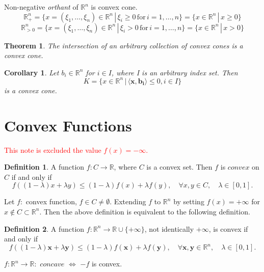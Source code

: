 \documentclass{jsarticle}
\newtheorem{thm}{Theorem}[section]
\newtheorem{cor}{Corollary}[thm]
\theoremstyle{definition}
\newtheorem{dfn}{Definition}[section]
\begin{document}
Non-negative \textit{orthant}  of $\mathbb{R}^n$ is convex cone.
\[
\mathbb{R}^n_{+} = \{x = (\xi_1,  \dots, \xi_n) \in \mathbb{R}^n \, | \, \xi_i \ge 0 \, \text{for}\,  i = 1,  \dots,  n\} = \{x \in \mathbb{R}^n \, | \, x \ge 0\}
\]
\[
\mathbb{R}^n_{> 0} = \{x = (\xi_1,  \dots, \xi_n) \in \mathbb{R}^n \, | \, \xi_i > 0 \, \text{for}\,  i = 1,  \dots,  n\} = \{x \in \mathbb{R}^n \, | \, x > 0\}
\]


\begin{thm}
The intersection of an arbitrary collection of convex cones is a convex cone.
\end{thm}

\begin{cor}
Let  $b_i \in \mathbb{R}^n$ for $i \in I$, where I is an arbitrary index set.  Then
\[
K = \{x \in \mathbb{R}^n \, | \, \langle \bm{x}, \bm{b_i} \rangle \le 0, i \in I \}
\]
is a convex cone.

\end{cor}




\section{Convex Functions}

\textcolor{red}{This note is excluded the value $f(x) = - \infty$.}

\begin{dfn}
A function $f:C \to \mathbb{R}$,  where $C$ is a convex set.  Then $f$ is $convex$ on $C$ if and only if
\[
f((1 - \lambda)x + \lambda y) \le (1 - \lambda) f(x) + \lambda f(y), \quad \forall x, y \in C, \quad \lambda \in [0, 1].
\] 
\end{dfn}

Let
$f:$ convex function,  $f \in C \ne \emptyset$.
Extending $f$ to $\mathbb{R}^n$ by setting $f(x) = +\infty$ for $x \notin C \subset \mathbb{R}^n$.
Then the above definition is equivalent to the following definition.

\begin{dfn}
A function $f:\mathbb{R}^n \to \mathbb{R} \cup \{+ \infty\}$,  not identically $+ \infty$,  is convex if and only if
\[
f((1 - \lambda)\bm{x} + \lambda \bm{y}) \le (1 - \lambda) f(\bm{x}) + \lambda f(\bm{y}), \quad \forall \bm{x}, \bm{y} \in \mathbb{R}^n, \quad \lambda \in [0, 1].
\] 
\end{dfn}


$f: \mathbb{R}^n \to \mathbb{R} :$ $concave$  $\Leftrightarrow$ $- f$ is convex.
\end{document}
